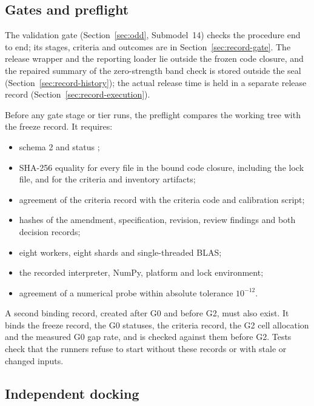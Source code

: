 \subsection{Gates and preflight}

The validation gate (Section~\ref{sec:odd}, Submodel~14) checks the procedure end to end; its stages, criteria and outcomes are in Section~\ref{sec:record-gate}. The release wrapper and the reporting loader lie outside the frozen code closure, and the repaired summary of the zero-strength band check is stored outside the seal (Section~\ref{sec:record-history}); the actual release time is held in a separate release record (Section~\ref{sec:record-execution}).

Before any gate stage or tier runs, the preflight compares the working tree with the freeze record. It requires:
\begin{itemize}
\item schema 2 and status ;
\item SHA-256 equality for every file in the bound code closure, including the lock file, and for the criteria and inventory artifacts;
\item agreement of the criteria record with the criteria code and calibration script;
\item hashes of the amendment, specification, revision, review findings and both decision records;
\item eight workers, eight shards and single-threaded BLAS;
\item the recorded interpreter, NumPy, platform and lock environment;
\item agreement of a numerical probe within absolute tolerance $10^{-12}$.
\end{itemize}
A second binding record, created after G0 and before G2, must also exist. It binds the freeze record, the G0 statuses, the criteria record, the G2 cell allocation and the measured G0 gap rate, and is checked against them before G2. Tests check that the runners refuse to start without these records or with stale or changed inputs.

\subsection{Independent docking}\label{sec:verification-docking}

